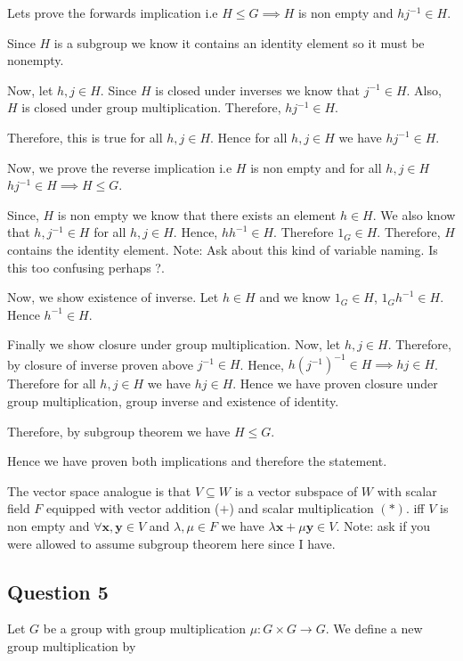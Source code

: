 \begin{solution}
 Lets prove the forwards implication i.e \( H \le G \implies H  \) is non empty and \( hj^{-1} \in H\).

 Since \( H \) is a subgroup we know it contains an identity element so it must be nonempty.  

 Now, let \( h,j \in H \). Since \( H \) is closed under inverses we know that \( j^{-1} \in H \).
 Also, \( H \) is closed under group multiplication. Therefore, \( h j^{-1} \in H \).

 Therefore, this is true for all \( h,j \in H  \). Hence for all \( h,j \in H \) we have \( hj^{-1} \in H \).

 Now, we prove the reverse implication i.e \( H  \) is non empty and for all \( h,j \in H \) \( hj^{-1} \in H \implies H \le G \).

 Since, \( H \) is non empty we know that there exists an element \( h \in H  \). We also know that \( h,j^{-1} \in H \) for all
 \( h,j \in  H\). Hence, \( h h^{-1} \in H \). Therefore \( 1_{G} \in H \). Therefore,
 \( H \) contains the identity element.
 Note: Ask about this kind of variable naming. Is this too confusing perhaps ?.

 Now, we show existence of inverse. Let \( h \in H \) and we know \( 1_{G} \in H \), \( 1_{G}h^{-1} \in H\). Hence \( h^{-1} \in H\).

 Finally we show closure under group multiplication.
 Now, let \( h, j \in H \). Therefore, by closure of inverse proven above \( j^{-1} \in H  \). Hence,
 \( h(j^{-1})^{-1} \in H \implies hj \in H\). Therefore for all \(h,j \in H  \) we have \( hj \in H \).
 Hence we have proven closure under group multiplication, group inverse and existence of identity.

 Therefore, by subgroup theorem we have \( H \le G \).

 Hence we have proven both implications and therefore the statement.

 The vector space analogue is that \( V  \subseteq W \) is a vector subspace of \(W  \) with scalar field \( F \) equipped with vector addition (\( + \)) and scalar multiplication \( (*) \).
 iff \( V \) is non empty and \( \forall \mathbf{x},\mathbf{y} \in V   \) and \( \lambda, \mu   \in F \) we have \(\lambda \mathbf{x} + \mu  \mathbf{y}  \in V\).
 Note: ask if you were allowed to assume subgroup theorem here since I have.
\end{solution}

\subsection{Question 5}
Let \( G \) be a group with group multiplication \( \mu : G \times  G \to  G\). We define a 
new group multiplication by \(  \)

